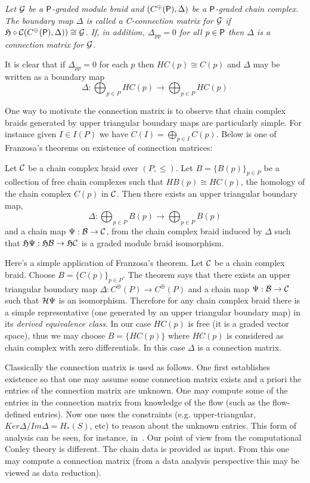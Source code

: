 \begin{defn}
{\em
Let ${\mathcal G}$ be a ${\mathsf P}$-graded module braid and $(C^\oplus({\mathsf P}),\Delta)$ be a ${\mathsf P}$-graded chain complex.  The boundary map $\Delta$ is called a {\em C-connection matrix for} ${\mathcal G}$ if $\mathfrak{H}\circ {\mathcal C}(C^\oplus({\mathsf P}),\Delta))\cong {\mathcal G}$.  If, in addition, $\Delta_{pp}=0$ for all $p\in {\mathsf P}$ then $\Delta$ is a {\em connection matrix for} ${\mathcal G}$.
}
\end{defn}

It is clear that if $\Delta_{pp}=0$ for each $p$ then $HC(p)\cong C(p)$ and $\Delta$ may be written as a boundary map $$\Delta:\bigoplus_{p\in P} HC(p)\to \bigoplus_{p\in P} HC(p)$$

One way to motivate the connection matrix is to observe that chain complex braids generated by upper triangular boundary maps are particularly simple.  For instance given $I\in I(P)$ we have $C(I) = \bigoplus_{p\in I} C(p)$.  Below is one of Franzosa's theorems on existence of connection matrices:

\begin{thm}
Let ${\mathcal C}$ be a chain complex braid over $(P,\leq)$.  Let $B=\{B(p)\}_{p\in P}$ be a collection of free chain complexes such that $HB(p) \cong HC(p)$, the homology of the chain complex $C(p)$ in ${\mathcal C}$.  Then there exists an upper triangular boundary map, $$\Delta:\bigoplus_{p\in P} B(p)\to \bigoplus_{p\in P}B(p)$$ and a chain map $\Psi:{\mathcal B}\to {\mathcal C}$, from the chain complex braid induced by $\Delta$ such that $\mathfrak{H}\Psi:\mathfrak{H}{\mathcal B}\to \mathfrak{H}{\mathcal C}$ is a graded module braid isomorphism.
\end{thm}

Here's a simple application of Franzosa's theorem.  Let ${\mathcal C}$ be a chain complex braid.  Choose $B = \{C(p)\}_{p\in P}$.  The theorem says that there exists an upper triangular boundary map $\Delta:C^\oplus(P)\to C^\oplus(P)$ and a chain map $\Psi:{\mathcal B}\to {\mathcal C}$ such that ${\mathcal H}\Psi$ is an isomorphism.  Therefore for any chain complex braid there is a simple representative (one generated by an upper triangular boundary map) in its {\em derived equivalence class}.  In our case $HC(p)$ is free (it is a graded vector space), thus we may choose $B=\{HC(p)\}$ where $HC(p)$ is considered as chain complex with zero differentials.  In this case $\Delta$ is a connection matrix.


\begin{rem}
Classically the connection matrix is used as follows.  One first establishes existence so that one may assume some connection matrix exists and a priori the entries of the connection matrix are unknown.  One may compute some of the entries in the connection matrix from knowledge of the flow (such as the flow-defined entries).  Now one uses the constraints (e.g. upper-triangular, $Ker\Delta/Im\Delta = H_*(S)$, etc) to reason about the unknown entries.  This form of analysis can be seen, for instance, in~\cite{}.  Our point of view from the computational Conley theory is different.  The chain data is provided as input.  From this one may compute a connection matrix (from a data analysis perspective this may be viewed as data reduction). 
\end{rem}


